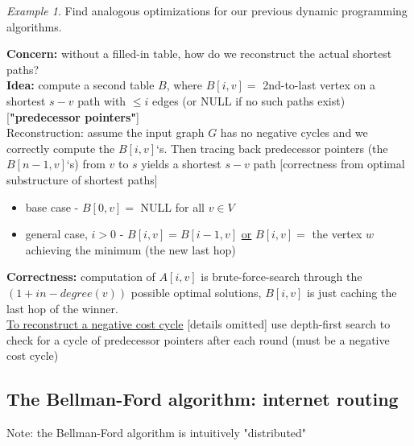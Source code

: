 \documentclass[a4paper,12pt]{article}
\theoremstyle{plain}
\theoremstyle{definition}
\theoremstyle{remark}
\newtheorem*{example}{Example}
\begin{document}
\begin{example}Find analogous optimizations for our previous dynamic programming algorithms.\end{example}

\textbf{Concern:} without a filled-in table, how do we reconstruct the actual shortest paths?
\\

\textbf{Idea:} compute a second table $B$, where $B[i, v] =$ 2nd-to-last vertex on a shortest $s-v$ path with $\leq i$ edges (or NULL if no such paths exist) [\textbf{"predecessor pointers"}]
\\

Reconstruction: assume the input graph $G$ has no negative cycles and we correctly compute the $B[i, v]$`s. Then tracing back predecessor pointers (the $B[n-1,v]$`s) from $v$ to $s$ yields a shortest $s-v$ path [correctness from optimal substructure of shortest paths]

\begin{itemize}
	\item base case - $B[0, v] =$ NULL for all $v \in V$
	\item general case, $i > 0$ - $B[i, v] = B[i-1, v]$ \underline{or} $B[i, v] =$ the vertex $w$ achieving the minimum (the new last hop)
\end{itemize}

\textbf{Correctness:} computation of $A[i, v]$ is brute-force-search through the $(1 + in-degree(v))$ possible optimal solutions, $B[i, v]$ is just caching the last hop of the winner.
\\

\underline{To reconstruct a negative cost cycle} [details omitted] use depth-first search to check for a cycle of predecessor pointers after each round (must be a negative cost cycle)



\subsection{The Bellman-Ford algorithm: internet routing}
Note: the Bellman-Ford algorithm is intuitively "distributed"
\\
\end{document}
